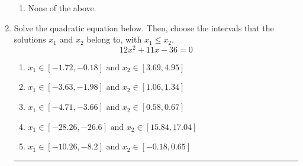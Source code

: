 \documentclass[14pt]{extbook}
\newcommand{\litem}[1]{\item#1\hspace*{-1cm}\rule{\textwidth}{0.4pt}}
\begin{document}
\begin{enumerate}
{\begin{enumerate}[label=\Alph*.]
\item None of the above.
\end{enumerate} }
\litem{
Solve the quadratic equation below. Then, choose the intervals that the solutions $x_1$ and $x_2$ belong to, with $x_1 \leq x_2$.\[ 12x^{2} +11 x -36 = 0 \]\begin{enumerate}[label=\Alph*.]
\item \( x_1 \in [-1.72, -0.18] \text{ and } x_2 \in [3.69, 4.95] \)
\item \( x_1 \in [-3.63, -1.98] \text{ and } x_2 \in [1.06, 1.34] \)
\item \( x_1 \in [-4.71, -3.66] \text{ and } x_2 \in [0.58, 0.67] \)
\item \( x_1 \in [-28.26, -26.6] \text{ and } x_2 \in [15.84, 17.04] \)
\item \( x_1 \in [-10.26, -8.2] \text{ and } x_2 \in [-0.18, 0.65] \)

\end{enumerate} }
\end{enumerate}
\end{document}
